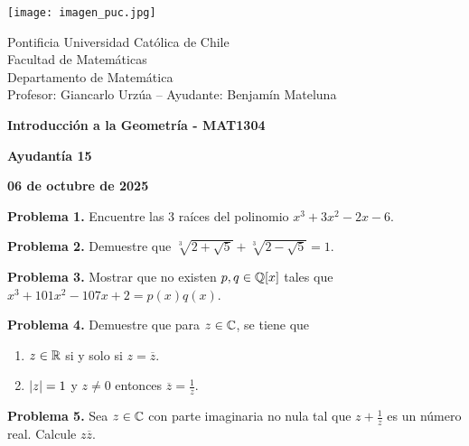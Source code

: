 \documentclass{article}
\begin{document}
\begin{minipage}{2.5cm}
    \texttt{[image: imagen\_puc.jpg]}
\end{minipage}
\begin{minipage}{14cm}
    {\sc Pontificia Universidad Católica de Chile\\
    Facultad de Matemáticas\\
    Departamento de Matemática\\
    Profesor: Giancarlo Urzúa -- Ayudante: Benjamín Mateluna}
\end{minipage}
\vspace{1ex}

{\centerline{\bf Introducción a la Geometría - MAT1304}
\centerline{\bf Ayudantía 15}}
\centerline{\bf 06 de octubre de 2025}

\vspace{1cm}
\noindent\textbf{Problema 1.} Encuentre las 3 raíces del polinomio $x^{3}+3x^{2}-2x-6$.

\vspace{5mm}
\noindent\textbf{Problema 2.} Demuestre que $\sqrt[3]{2+\sqrt{5}}+\sqrt[3]{2-\sqrt{5}}=1$.

\vspace{5mm}
\noindent\textbf{Problema 3.} Mostrar que no existen $p,q\in\mathbb{Q}[x]$ tales que 
$x^{3}+101x^{2}-107x+2=p(x)q(x)$.

\vspace{5mm}
\noindent\textbf{Problema 4.} Demuestre que para $z\in\mathbb{C}$, se tiene que
\begin{enumerate}
    \item $z\in\mathbb{R}$ si y solo si $z=\overline{z}$.
    \item $\left|z \right|=1$ y $z\neq0$ entonces $\overline{z}=\frac{1}{z}$.
\end{enumerate}

\vspace{5mm}
\noindent\textbf{Problema 5.} Sea $z\in\mathbb{C}$ con parte imaginaria no nula tal que $z+\frac{1}{z}$ es 
un número real. Calcule $z\overline{z}$.

\end{document}
